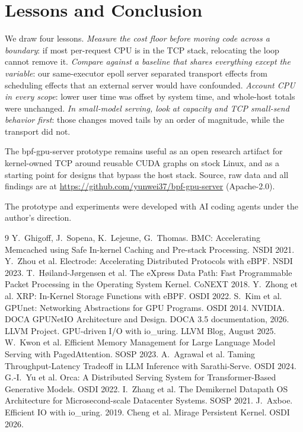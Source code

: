 \documentclass[sigconf,nonacm]{acmart}
\begin{document}
\section{Lessons and Conclusion}

We draw four lessons. \emph{Measure the cost floor before moving code across a
boundary}: if most per-request CPU is in the TCP stack, relocating the loop
cannot remove it. \emph{Compare against a baseline that shares everything except
the variable}: our same-executor epoll server separated transport effects from
scheduling effects that an external server would have confounded.
\emph{Account CPU in every scope}: lower user time was offset by system time,
and whole-host totals were unchanged. \emph{In small-model serving, look at
capacity and TCP small-send behavior first}: those changes moved tails by an
order of magnitude, while the transport did not.

The bpf-gpu-server prototype remains useful as an open research artifact for kernel-owned TCP
around reusable CUDA graphs on stock Linux, and as a starting point for
designs that bypass the host stack. Source, raw data and all findings are at
\url{https://github.com/yunwei37/bpf-gpu-server} (Apache-2.0).

\begin{acks}
The prototype and experiments were developed with AI coding agents under the
author's direction.
\end{acks}

\begin{thebibliography}{9}
 Y.~Ghigoff, J.~Sopena, K.~Lejeune, G.~Thomas. BMC: Accelerating
Memcached using Safe In-kernel Caching and Pre-stack Processing. NSDI 2021.
 Y.~Zhou et al. Electrode: Accelerating Distributed
Protocols with eBPF. NSDI 2023.
 T.~H{\o}iland-J{\o}rgensen et al. The eXpress Data Path: Fast
Programmable Packet Processing in the Operating System Kernel. CoNEXT 2018.
 Y.~Zhong et al. XRP: In-Kernel Storage Functions with eBPF. OSDI
2022.
 S.~Kim et al. GPUnet: Networking Abstractions for GPU
Programs. OSDI 2014.
 NVIDIA. DOCA GPUNetIO Architecture and Design. DOCA 3.5
documentation, 2026.
 LLVM Project. GPU-driven I/O with io\_uring. LLVM Blog,
August 2025.
 W.~Kwon et al. Efficient Memory Management for Large Language
Model Serving with PagedAttention. SOSP 2023.
 A.~Agrawal et al. Taming Throughput-Latency Tradeoff in LLM
Inference with Sarathi-Serve. OSDI 2024.
 G.-I.~Yu et al. Orca: A Distributed Serving System for
Transformer-Based Generative Models. OSDI 2022.
 I.~Zhang et al. The Demikernel Datapath OS Architecture
for Microsecond-scale Datacenter Systems. SOSP 2021.
 J.~Axboe. Efficient IO with io\_uring. 2019.
 Cheng et al. Mirage Persistent Kernel. OSDI 2026.
\end{thebibliography}
\end{document}
